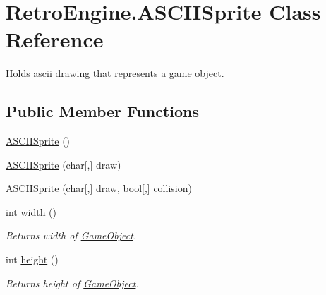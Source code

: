 \hypertarget{class_retro_engine_1_1_a_s_c_i_i_sprite}{}\section{Retro\+Engine.\+A\+S\+C\+I\+I\+Sprite Class Reference}
\label{class_retro_engine_1_1_a_s_c_i_i_sprite}


Holds ascii drawing that represents a game object.  


\subsection*{Public Member Functions}
\begin{DoxyCompactItemize}
\item 
\mbox{\hyperlink{class_retro_engine_1_1_a_s_c_i_i_sprite_a2425c2cc64e415e7e340b9c78a2ee15a}{A\+S\+C\+I\+I\+Sprite}} ()
\item 
\mbox{\hyperlink{class_retro_engine_1_1_a_s_c_i_i_sprite_a61b0c2d820c9a46b758a1f8e6be8c601}{A\+S\+C\+I\+I\+Sprite}} (char\mbox{[},\mbox{]} draw)
\item 
\mbox{\hyperlink{class_retro_engine_1_1_a_s_c_i_i_sprite_a4a30ec664f86781c5bffe2a492399c97}{A\+S\+C\+I\+I\+Sprite}} (char\mbox{[},\mbox{]} draw, bool\mbox{[},\mbox{]} \mbox{\hyperlink{class_retro_engine_1_1_a_s_c_i_i_sprite_af59bbd2956a9d63025bd945adc58fac8}{collision}})
\item 
int \mbox{\hyperlink{class_retro_engine_1_1_a_s_c_i_i_sprite_a2e59c926d99fa49f70d164f7877c5f16}{width}} ()
\begin{DoxyCompactList}\small\item\em Returns width of \mbox{\hyperlink{class_retro_engine_1_1_game_object}{Game\+Object}}. \end{DoxyCompactList}\item 
int \mbox{\hyperlink{class_retro_engine_1_1_a_s_c_i_i_sprite_a27914fc12903dbba66f51a5a3374748e}{height}} ()
\begin{DoxyCompactList}\small\item\em Returns height of \mbox{\hyperlink{class_retro_engine_1_1_game_object}{Game\+Object}}. \end{DoxyCompactList}\end{DoxyCompactItemize}
